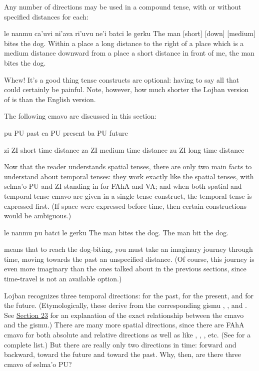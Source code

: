 Any number of directions may be used in a compound tense, with
    or without specified distances for each:
\begin{example}
le nanmu ca'uvi ni'ava\n
\T	ri'uvu ne'i\n
\T	batci le gerku\n
The man  [short] [down] [medium]\n
\T	[right] [long] [within]\n
\T	bites the dog.\n
Within a place a long distance to the right\n
\T	of a place which is a medium distance downward\n
\T	from a place a short distance in front of me,\n
\T	the man bites the dog.
\end{example}

Whew! It's a good thing tense constructs are optional:
    having to say all that could certainly be painful. Note,
    however, how much shorter the Lojban version of  is than the English version.



The following cmavo are discussed in this section:

   pu  PU  past
    ca  PU  present
    ba  PU  future

zi  ZI  short time distance
    za  ZI  medium time distance
    zu  ZI  long time distance

Now that the reader understands spatial tenses, there are only
    two main facts to understand about temporal tenses: they work
    exactly like the spatial tenses, with selma'o PU and ZI
    standing in for FAhA and VA; and when both spatial and temporal
    tense cmavo are given in a single tense construct, the temporal
    tense is expressed first. (If space were expressed before time,
    then certain constructions would be ambiguous.)
\begin{example}
le nanmu pu batci le gerku\n
The man  bites the dog.\n
The man bit the dog.
\end{example}

{\noindent}means that to reach the dog-biting, you must take an imaginary
    journey through time, moving towards the past an unspecified
    distance. (Of course, this journey is even more imaginary than
    the ones talked about in the previous sections, since
    time-travel is not an available option.) 

Lojban recognizes three temporal directions:  for the
    past,  for the present, and  for the future.
    (Etymologically, these derive from the corresponding gismu
    , , and . See \hyperref[sec:10:23]{Section
    23} for an explanation of the exact relationship between the
    cmavo and the gismu.) There are many more spatial directions,
    since there are FAhA cmavo for both absolute and relative
    directions as well as  like
    , , , etc. (See  for a complete list.) But there are
    really only two directions in time: forward and backward,
    toward the future and toward the past. Why, then, are there
    three cmavo of selma'o PU?


